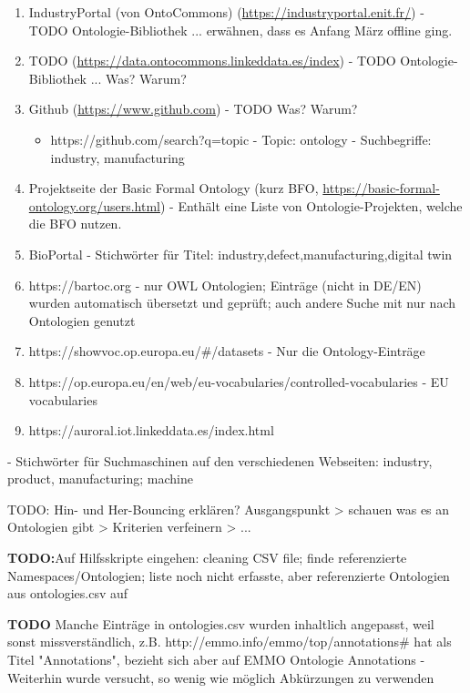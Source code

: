 \documentclass{article}
\begin{document}
\begin{enumerate}
    \item IndustryPortal (von OntoCommons) (\url{https://industryportal.enit.fr/}) - TODO Ontologie-Bibliothek ... erwähnen, dass es Anfang März offline ging.
    \item TODO (\url{https://data.ontocommons.linkeddata.es/index}) - TODO Ontologie-Bibliothek ... Was? Warum?
    \item Github (\url{https://www.github.com}) - TODO Was? Warum?
       \begin{itemize}
           \item https://github.com/search?q=topic%
           - Topic: ontology
           - Suchbegriffe: industry, manufacturing
       \end{itemize}
    \item Projektseite der Basic Formal Ontology (kurz BFO, \url{https://basic-formal-ontology.org/users.html}) - Enthält eine Liste von Ontologie-Projekten, welche die BFO nutzen.
    \item BioPortal - Stichwörter für Titel: industry,defect,manufacturing,digital twin
    \item https://bartoc.org - nur OWL Ontologien; Einträge (nicht in DE/EN) wurden automatisch übersetzt und geprüft;  auch andere Suche mit nur nach Ontologien genutzt
    \item https://showvoc.op.europa.eu/\#/datasets - Nur die Ontology-Einträge
    \item https://op.europa.eu/en/web/eu-vocabularies/controlled-vocabularies - EU vocabularies
    \item https://auroral.iot.linkeddata.es/index.html
\end{enumerate}

- Stichwörter für Suchmaschinen auf den verschiedenen Webseiten: industry, product, manufacturing; machine

TODO: Hin- und Her-Bouncing erklären? Ausgangspunkt > schauen was es an Ontologien gibt > Kriterien verfeinern > ...

\textbf{TODO:}Auf Hilfsskripte eingehen: cleaning CSV file; finde referenzierte Namespaces/Ontologien; liste noch nicht erfasste, aber referenzierte Ontologien aus ontologies.csv auf

\textbf{TODO} Manche Einträge in ontologies.csv wurden inhaltlich angepasst, weil sonst missverständlich, z.B. http://emmo.info/emmo/top/annotations\# hat als Titel "Annotations", bezieht sich aber auf EMMO Ontologie Annotations
- Weiterhin wurde versucht, so wenig wie möglich Abkürzungen zu verwenden
\end{document}
